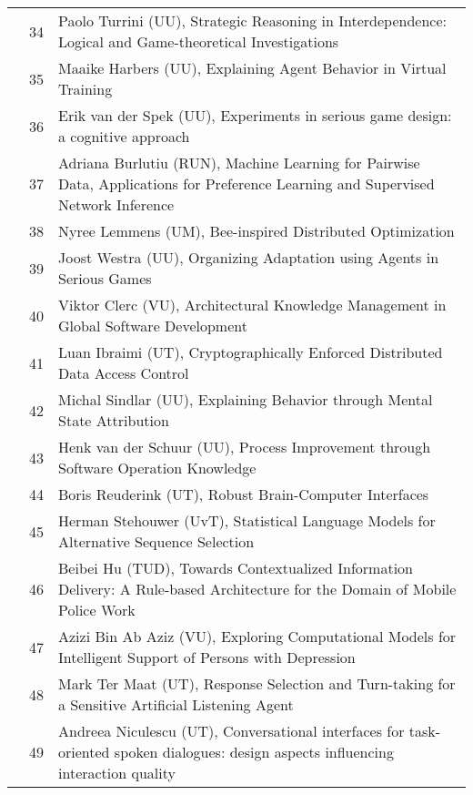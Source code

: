 \begin{longtabu}{@{}l@{ }l@{\hspace{1em}}X}
	&	 34	&	 Paolo Turrini (UU), Strategic Reasoning in Interdependence: Logical and Game-theoretical Investigations\\
	&	 35	&	 Maaike Harbers (UU), Explaining Agent Behavior in Virtual Training\\
	&	 36	&	 Erik van der Spek (UU), Experiments in serious game design: a cognitive approach\\
	&	 37	&	 Adriana Burlutiu (RUN), Machine Learning for Pairwise Data, Applications for Preference Learning and Supervised Network Inference\\
	&	 38	&	 Nyree Lemmens (UM), Bee-inspired Distributed Optimization\\
	&	 39	&	 Joost Westra (UU), Organizing Adaptation using Agents in Serious Games\\
	&	 40	&	 Viktor Clerc (VU), Architectural Knowledge Management in Global Software Development\\
	&	 41	&	 Luan Ibraimi (UT), Cryptographically Enforced Distributed Data Access Control\\
	&	 42	&	 Michal Sindlar (UU), Explaining Behavior through Mental State Attribution\\
	&	 43	&	 Henk van der Schuur (UU), Process Improvement through Software Operation Knowledge\\
	&	 44	&	 Boris Reuderink (UT), Robust Brain-Computer Interfaces\\
	&	 45	&	 Herman Stehouwer (UvT), Statistical Language Models for Alternative Sequence Selection\\
	&	 46	&	 Beibei Hu (TUD), Towards Contextualized Information Delivery: A Rule-based Architecture for the Domain of Mobile Police Work\\
	&	 47	&	 Azizi Bin Ab Aziz (VU), Exploring Computational Models for Intelligent Support of Persons with Depression\\
	&	 48	&	 Mark Ter Maat (UT), Response Selection and Turn-taking for a Sensitive Artificial Listening Agent\\
	&	 49	&	 Andreea Niculescu (UT), Conversational interfaces for task-oriented spoken dialogues: design aspects influencing interaction quality\\


\end{longtabu}
